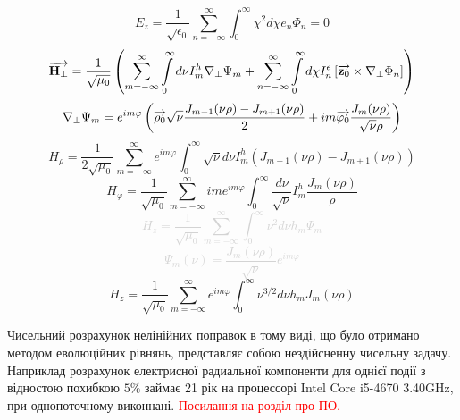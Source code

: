 %
\begin{equation*} 
E_z = \frac{1}{\sqrt{\epsilon_0}} \sum_{n=-\infty}^{\infty}
\int_0^\infty \chi^2 d \chi e_n \Phi_n = 0
\end{equation*}
%
\textcolor{lightgray} { \begin{equation*}
\overrightarrow{\mathbf H_\perp} = \frac{1}{\sqrt{\mu_0}} \left( 
\sum \limits_{m=-\infty}^{\infty} \int \limits_{0}^{\infty} d \nu
I_m^h \nabla_\perp \Psi_m + \sum \limits_{n=-\infty}^{\infty}
\int \limits_{0}^{\infty} d \chi I_n^e 
\left[ \overrightarrow{\mathbf z_0} \times \nabla_\perp \Phi_n \right] \right)
\end{equation*} }
%
\textcolor{lightgray} { \begin{equation*} \begin{aligned}
\nabla_\perp \Psi_m = e^{i m \varphi} \left( \overrightarrow{\mathbf \rho_0} 
\sqrt{\nu} \frac{ J_{m-1}(\nu \rho) - J_{m+1}(\nu \rho) }{2} +
i m \overrightarrow{\mathbf \varphi_0} \frac{J_m(\nu \rho)}{\sqrt{\nu} \rho} \right)
\end{aligned} \end{equation*} }
%
\begin{equation*}
H_\rho = \frac{1}{2 \sqrt{\mu_0}} \sum_{m=-\infty}^{\infty} 
e^{im\varphi} \int_{0}^{\infty} \sqrt{\nu} d \nu
I_m^h \left( J_{m-1}(\nu \rho) - J_{m+1}(\nu \rho) \right)
\end{equation*}
%
\begin{equation*}
H_\varphi = \frac{1}{\sqrt{\mu_0}} \sum_{m=-\infty}^{\infty} 
i m e^{im\varphi} \int_{0}^{\infty} \frac{d \nu}{\sqrt{\nu}}
I_m^h \frac{J_m(\nu \rho)}{\rho}
\end{equation*}
%
\textcolor{lightgray} { \begin{equation*} 
H_z = \frac{1}{\sqrt{\mu_0}} \sum_{m=-\infty}^{\infty}
\int_0^\infty \nu^2 d \nu h_m \Psi_m
\end{equation*} }
%
\textcolor{lightgray} { \begin{equation*} 
\Psi_m (\nu) = \frac{J_m(\nu \rho)}{\sqrt{\nu}} e^{i m \varphi}
\end{equation*} }
%
\begin{equation*} 
H_z = \frac{1}{\sqrt{\mu_0}} \sum_{m=-\infty}^{\infty}
e^{i m \varphi} \int_0^\infty \nu^{3/2} d \nu h_m 
J_m(\nu \rho)
\end{equation*}

Чисельний розрахунок нелінійних поправок в тому виді, що було отримано методом 
еволюційних рівнянь, представляє собою нездійсненну чисельну задачу. Наприклад 
розрахунок електрисної радиальної компоненти для однієї події з відностою 
похибкою $ 5\% $ займає 21 рік на процессорі Intel Core i5-4670 3.40GHz, 
при однопоточному виконнані. \textcolor{red} { Посилання на розділ про ПО. }

